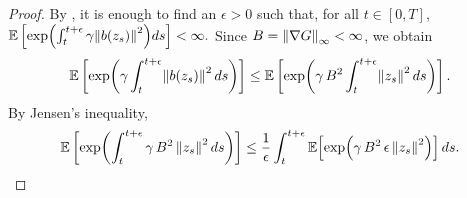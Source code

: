 \documentclass[11pt, twoside]{report}
\begin{document}
\begin{proof}

By \cite[Corollary 5.14]{Karatzas1991-xr}, it is enough to find an $\epsilon>0$ such that, for all $t\in [0,T]$, 
$
\EE\left[ \exp\pa{\int_t^{t+\epsilon}  \gamma \norm{b(z_s)}^2} ds \right] <\infty.
$
Since $B = \left\lVert\nabla G\right\rVert_\infty<\infty$, we obtain
\begin{align*}
    \EE\left[ \exp\pa{\gamma \int_t^{t+\epsilon} \norm{b(z_s)}^2 \,ds} \right] \leq  \EE\left[\exp\pa{ \gamma \,\cinfty^2\int_t^{t+\epsilon} \norm{z_s}^2 \,ds }\right].
\end{align*}
By Jensen's inequality,
\begin{equation}\label{eq:novikov}
    \EE\left[\exp\pa{ \int_t^{t+\epsilon} \gamma\, \cinfty^2\, \norm{z_s}^2 \,ds} \right] \leq  \frac{1}{\epsilon}  \int_t^{t+\epsilon} \EE\Bigl[ \exp\pa{\gamma\, \cinfty^2\, \epsilon\,  \norm{z_s}^2 } \Bigr] \,ds.
\end{equation}


\end{proof}
\end{document}
